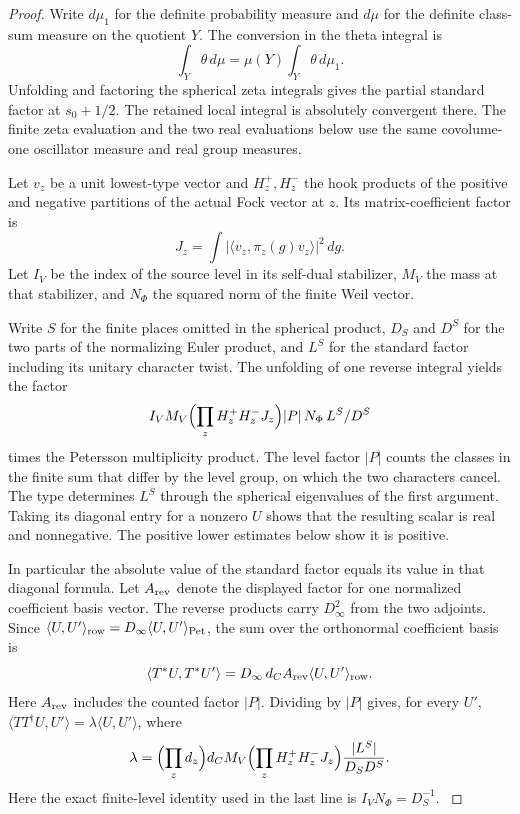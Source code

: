 \begin{proof}
Write \(d\mu_1\) for the definite probability measure and
\(d\mu\) for the definite class-sum measure on the quotient \(Y\).
The conversion in the theta integral is
\[
   \int_Y \theta\,d\mu=\mu(Y)\int_Y\theta\,d\mu_1 .
\] Unfolding and factoring the spherical zeta
integrals gives the partial standard factor at
\(s_0+1/2\). The retained local integral is absolutely
convergent there. The finite zeta evaluation and the two
real evaluations below use the same covolume-one
oscillator measure and real group measures.
\cite{yamana-siegel-weil}\label{cor:selected-lift-scalar-2}

Let \(v_z\) be a unit lowest-type vector and \(H_z^+,H_z^-\) the hook products of the positive and negative partitions of the actual Fock vector at \(z\). Its matrix-coefficient factor is
\[
 J_z=\int |\langle v_z,\pi_z(g)v_z\rangle|^2\,dg .
\] Let \(I_V\) be the index of the source
level in its self-dual stabilizer, \(M_V\) the mass at
that stabilizer, and \(N_\Phi\) the squared norm of
the finite Weil vector.

Write \(S\) for the finite
places omitted in the spherical product, \(D_S\)
and \(D^S\) for the two parts of the normalizing
Euler product, and \(L^S\) for the standard factor
including its unitary character twist. The unfolding
of one reverse integral yields the factor
\[
 I_VM_V\Bigl(\prod_z H_z^+H_z^-J_z\Bigr)
       |P|\,N_\Phi\, L^S/D^S
\]
times the Petersson multiplicity product. The
level factor \(|P|\) counts the classes in the
finite sum that differ by the level group, on which
the two characters cancel. The type determines
\(L^S\) through the spherical eigenvalues of the
first argument. Taking its diagonal entry for a
nonzero \(U\) shows that the resulting scalar is
real and nonnegative. The positive lower estimates
below show it is positive.

In particular the
absolute value of the standard factor equals its
value in that diagonal formula. Let \(A_{\rm rev}\)
denote the displayed factor for one normalized coefficient
basis vector. The reverse products carry \(D_\infty^2\)
from the two adjoints. Since
\(\langle U,U'\rangle_{\rm row}
      =D_\infty\langle U,U'\rangle_{\rm Pet}\),
the sum over the orthonormal coefficient basis is
\[
 \langle T^*U,T^*U'\rangle
     =D_\infty\,d_C A_{\rm rev}\langle U,U'\rangle_{\rm row}.
\]
Here \(A_{\rm rev}\) includes the counted factor \(|P|\). Dividing by \(|P|\)
gives, for every \(U'\),
\(\langle TT^\dagger U,U'\rangle=\lambda\langle U,U'\rangle\),
where
\begin{equation}\label{eq:selected-adelic-scalar}
 \lambda=\Bigl(\prod_z d_z\Bigr)d_C M_V
       \Bigl(\prod_z H_z^+H_z^-J_z\Bigr)
       \frac{|L^S|}{D_SD^S}.
\end{equation}
Here the exact finite-level identity used in the last
line is \(I_V N_\Phi=D_S^{-1}\).
\label{cor:selected-lift-scalar-3}


\end{proof}
